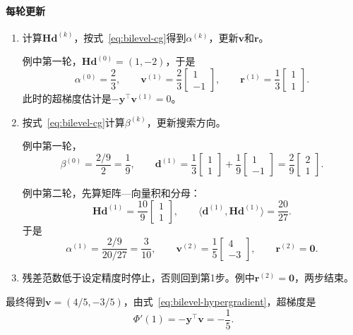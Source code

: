 \paragraph{每轮更新}
\begin{enumerate}
 \item 计算$\bm{H}\bm{d}^{(k)}$，按式~\eqref{eq:bilevel-cg}得到$\alpha^{(k)}$，更新$\bm{v}$和$\bm{r}$。

 例中第一轮，$\bm{H}\bm{d}^{(0)}=(1,-2)$，于是
 \[
  \alpha^{(0)}=\frac{2}{3},\qquad
  \bm{v}^{(1)}=\frac23\begin{bmatrix}1\\-1\end{bmatrix},\qquad
  \bm{r}^{(1)}=\frac13\begin{bmatrix}1\\1\end{bmatrix}.
 \]
 此时的超梯度估计是$-\bm{y}^{\top}\bm{v}^{(1)}=0$。

 \item 按式~\eqref{eq:bilevel-cg}计算$\beta^{(k)}$，更新搜索方向。

 例中第一轮，
 \[
  \beta^{(0)}=\frac{2/9}{2}=\frac19,\qquad
  \bm{d}^{(1)}=\frac13\begin{bmatrix}1\\1\end{bmatrix}+\frac19\begin{bmatrix}1\\-1\end{bmatrix}=\frac29\begin{bmatrix}2\\1\end{bmatrix}.
 \]

 例中第二轮，先算矩阵—向量积和分母：
 \[
  \bm{H}\bm{d}^{(1)}=\frac{10}{9}\begin{bmatrix}1\\1\end{bmatrix},\qquad\langle\bm{d}^{(1)},\bm{H}\bm{d}^{(1)}\rangle=\frac{20}{27}.
 \]
 于是
 \[
  \alpha^{(1)}=\frac{2/9}{20/27}=\frac{3}{10},\qquad
  \bm{v}^{(2)}=\frac15\begin{bmatrix}4\\-3\end{bmatrix},\qquad
  \bm{r}^{(2)}=\bm{0}.
 \]

 \item 残差范数低于设定精度时停止，否则回到第1步。例中$\bm{r}^{(2)}=\bm{0}$，两步结束。
\end{enumerate}

最终得到$\bm{v}=(4/5,-3/5)$，由式~\eqref{eq:bilevel-hypergradient}，超梯度是
\[
 \Phi'(1)=-\bm{y}^{\top}\bm{v}=-\frac15.
\]

